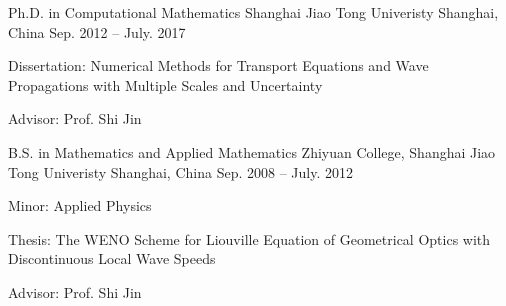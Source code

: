 

\begin{cventries}

  \cventry
    {Ph.D. in Computational Mathematics} %
    {Shanghai Jiao Tong Univeristy} %
    {Shanghai, China} %
    {Sep. 2012 -- July. 2017} %
    {
      \begin{cvitems} %
        \item {Dissertation: Numerical Methods for Transport Equations and Wave Propagations with Multiple Scales and Uncertainty}
        \item {Advisor: Prof. Shi Jin}
      \end{cvitems}
    }

  \cventry
    {B.S. in Mathematics and Applied Mathematics} %
    {Zhiyuan College, Shanghai Jiao Tong Univeristy} %
    {Shanghai, China} %
    {Sep. 2008 -- July. 2012} %
    {
      \begin{cvitems} %
        \item {Minor: Applied Physics}
        \item {Thesis: The WENO Scheme for Liouville Equation of Geometrical Optics with Discontinuous Local Wave Speeds}
        \item {Advisor: Prof. Shi Jin}
      \end{cvitems}
    }

\end{cventries}
